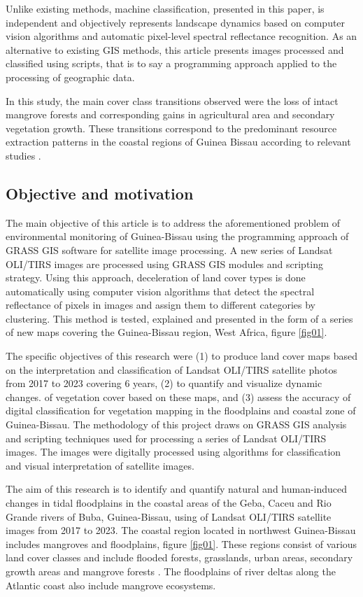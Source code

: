 \documentclass[final,5p,times,twocolumn]{elsarticle}
\begin{document}
Unlike existing methods, machine classification, presented in this paper, is independent and objectively represents landscape dynamics based on computer vision algorithms and automatic pixel-level spectral reflectance recognition. As an alternative to existing GIS methods, this article presents images processed and classified using scripts, that is to say a programming approach applied to the processing of geographic data.

In this study, the main cover class transitions observed were the loss of intact mangrove forests and corresponding gains in agricultural area and secondary vegetation growth. These transitions correspond to the predominant resource extraction patterns in the coastal regions of Guinea Bissau according to relevant studies \cite{PEREIRA2022100746,CARREIRAS2012426}.

\subsection{Objective and motivation}

The main objective of this article is to address the aforementioned problem of environmental monitoring of Guinea-Bissau using the programming approach of GRASS GIS software for satellite image processing. A new series of Landsat OLI/TIRS images are processed using GRASS GIS modules and scripting strategy. Using this approach, deceleration of land cover types is done automatically using computer vision algorithms that detect the spectral reflectance of pixels in images and assign them to different categories by clustering. This method is tested, explained and presented in the form of a series of new maps covering the Guinea-Bissau region, West Africa, figure \ref{fig01}.

The specific objectives of this research were (1) to produce land cover maps based on the interpretation and classification of Landsat OLI/TIRS satellite photos from 2017 to 2023 covering 6 years, (2) to quantify and visualize dynamic changes. of vegetation cover based on these maps, and (3) assess the accuracy of digital classification for vegetation mapping in the floodplains and coastal zone of Guinea-Bissau. The methodology of this project draws on GRASS GIS analysis and scripting techniques used for processing a series of Landsat OLI/TIRS images. The images were digitally processed using algorithms for classification and visual interpretation of satellite images.

The aim of this research is to identify and quantify natural and human-induced changes in tidal floodplains in the coastal areas of the Geba, Caceu and Rio Grande rivers of Buba, Guinea-Bissau, using of Landsat OLI/TIRS satellite images from 2017 to 2023. The coastal region located in northwest Guinea-Bissau includes mangroves and floodplains, figure \ref{fig01}. These regions consist of various land cover classes and include flooded forests, grasslands, urban areas, secondary growth areas and mangrove forests \cite{ANDREETTA2016314}. The floodplains of river deltas along the Atlantic coast also include mangrove ecosystems.
\end{document}
